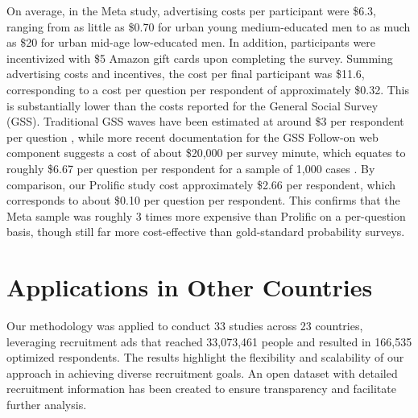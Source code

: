 On average, in the Meta study, advertising costs per participant were \$6.3, ranging from as little as \$0.70 for urban young medium-educated men to as much as \$20 for urban mid-age low-educated men. In addition, participants were incentivized with \$5 Amazon gift cards upon completing the survey. Summing advertising costs and incentives, the cost per final participant was \$11.6, corresponding to a cost per question per respondent of approximately \$0.32. This is substantially lower than the costs reported for the General Social Survey (GSS). Traditional GSS waves have been estimated at around \$3 per respondent per question \citep{goel2015non}, while more recent documentation for the GSS Follow-on web component suggests a cost of about \$20,000 per survey minute, which equates to roughly \$6.67 per question per respondent for a sample of 1,000 cases \citep{norc2024gss}. By comparison, our Prolific study cost approximately \$2.66 per respondent, which corresponds to about \$0.10 per question per respondent. This confirms that the Meta sample was roughly 3 times more expensive than Prolific on a per-question basis, though still far more cost-effective than gold-standard probability surveys.





\section{Applications in Other Countries}

Our methodology was applied to conduct 33 studies across 23 countries, leveraging recruitment ads that reached 33,073,461 people and resulted in 166,535 optimized respondents. The results highlight the flexibility and scalability of our approach in achieving diverse recruitment goals. An open dataset with detailed recruitment information has been created to ensure transparency and facilitate further analysis.





